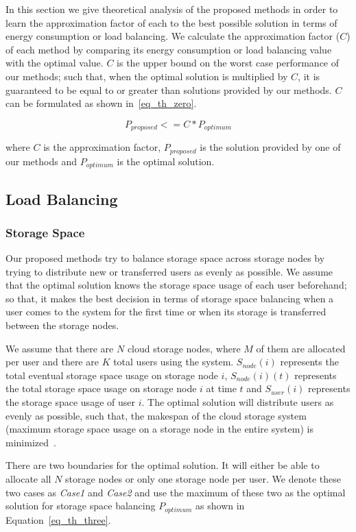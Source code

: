 In this section we give theoretical analysis of the proposed methods in order to learn
the approximation factor of each to the best possible solution in terms of energy consumption
or load balancing. We calculate the approximation factor ($C$) of each method by comparing its
energy consumption or load balancing value with the optimal value. $C$ is the upper bound on the
worst case performance of our methods; such that, when the optimal solution is multiplied
by $C$, it is guaranteed to be equal to or greater than solutions provided by our methods.
$C$ can be formulated as shown in~\eqref{eq_th_zero}.

\begin{equation}
P_{proposed} <= C * P_{optimum}
\label{eq_th_zero}
\end{equation}
\hfill

where $C$ is the approximation factor, $P_{proposed}$ is the solution provided by one of our
methods and $P_{optimum}$ is the optimal solution.

\subsection{Load Balancing}
\subsubsection{Storage Space}
Our proposed methods try to balance storage space across storage nodes by trying to
distribute new or transferred users as evenly as possible. We assume that the optimal solution
knows the storage space usage of each user beforehand; so that, it makes the best decision in 
terms of storage space balancing when a user comes to the system for the first time or when its
storage is transferred between the storage nodes.

We assume that there are $N$ cloud storage nodes, where $M$ of them are allocated per user and
there are $K$ total users using the system. $S_{node}(i)$ represents the total eventual storage space
usage on storage node $i$, $S_{node}(i)(t)$ represents the total storage space usage
on storage node $i$ at time $t$ and $S_{user}(i)$ represents the storage space usage of user $i$. The optimal
solution will distribute users as evenly as possible, such that, the makespan of the cloud storage
system (maximum storage space usage on a storage node in the entire system) is minimized~\cite{tu_lecture}.

There are two boundaries for the optimal solution. It will either be able to allocate all $N$
storage nodes or only one storage node per user. We denote these two cases as \textit{Case1}
and \textit{Case2} and use the maximum of these two as the optimal solution for storage space balancing
$P_{optimum}$ as shown in Equation~\eqref{eq_th_three}.

